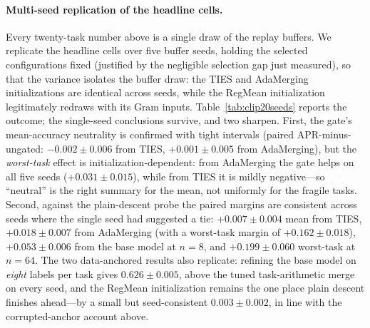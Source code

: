 \documentclass[11pt]{article}
\begin{document}
\paragraph{Multi-seed replication of the headline cells.}
Every twenty-task number above is a single draw of the replay buffers. We replicate the headline cells over five buffer seeds, holding the selected configurations fixed (justified by the negligible selection gap just measured), so that the variance isolates the buffer draw: the TIES and AdaMerging initializations are identical across seeds, while the RegMean initialization legitimately redraws with its Gram inputs. Table~\ref{tab:clip20seeds} reports the outcome; the single-seed conclusions survive, and two sharpen. First, the gate's mean-accuracy neutrality is confirmed with tight intervals (paired APR-minus-ungated: $-0.002\pm0.006$ from TIES, $+0.001\pm0.005$ from AdaMerging), but the \emph{worst-task} effect is initialization-dependent: from AdaMerging the gate helps on all five seeds ($+0.031\pm0.015$), while from TIES it is mildly negative---so ``neutral'' is the right summary for the mean, not uniformly for the fragile tasks. Second, against the plain-descent probe the paired margins are consistent across seeds where the single seed had suggested a tie: $+0.007\pm0.004$ mean from TIES, $+0.018\pm0.007$ from AdaMerging (with a worst-task margin of $+0.162\pm0.018$), $+0.053\pm0.006$ from the base model at $n=8$, and $+0.199\pm0.060$ worst-task at $n=64$. The two data-anchored results also replicate: refining the base model on \emph{eight} labels per task gives $0.626\pm0.005$, above the tuned task-arithmetic merge on every seed, and the RegMean initialization remains the one place plain descent finishes ahead---by a small but seed-consistent $0.003\pm0.002$, in line with the corrupted-anchor account above.
\end{document}
